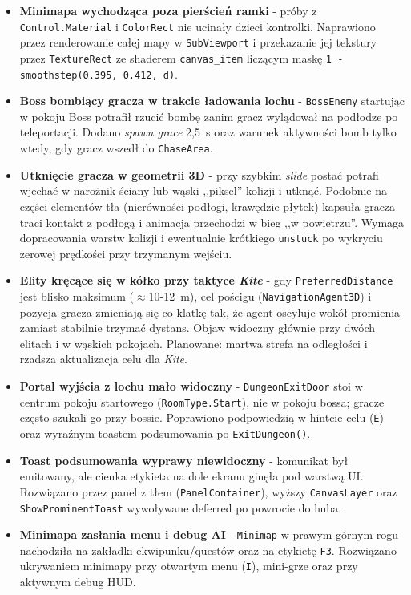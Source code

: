 \begin{itemize}
    \item \textbf{Minimapa wychodząca poza pierścień ramki} - próby z \texttt{Control.Material} i \texttt{ColorRect} nie ucinały dzieci kontrolki. Naprawiono przez renderowanie całej mapy w \texttt{SubViewport} i przekazanie jej tekstury przez \texttt{TextureRect} ze shaderem \texttt{canvas\_item} liczącym maskę \texttt{1 - smoothstep(0.395, 0.412, d)}.
    \item \textbf{Boss bombiący gracza w trakcie ładowania lochu} - \texttt{BossEnemy} startując w pokoju Boss potrafił rzucić bombę zanim gracz wylądował na podłodze po teleportacji. Dodano \emph{spawn grace} 2,5~s oraz warunek aktywności bomb tylko wtedy, gdy gracz wszedł do \texttt{ChaseArea}.
    \item \textbf{Utknięcie gracza w geometrii 3D} - przy szybkim \emph{slide} postać potrafi wjechać w narożnik ściany lub wąski ,,piksel'' kolizji i utknąć. Podobnie na części elementów tła (nierówności podłogi, krawędzie płytek) kapsuła gracza traci kontakt z podłogą i animacja przechodzi w bieg ,,w powietrzu''. Wymaga dopracowania warstw kolizji i ewentualnie krótkiego \texttt{unstuck} po wykryciu zerowej prędkości przy trzymanym wejściu.
    \item \textbf{Elity kręcące się w kółko przy taktyce \textit{Kite}} - gdy \texttt{PreferredDistance} jest blisko maksimum ($\approx 10$-12~m), cel pościgu (\texttt{NavigationAgent3D}) i pozycja gracza zmieniają się co klatkę tak, że agent oscyluje wokół promienia zamiast stabilnie trzymać dystans. Objaw widoczny głównie przy dwóch elitach i w wąskich pokojach. Planowane: martwa strefa na odległości i rzadsza aktualizacja celu dla \textit{Kite}.
    \item \textbf{Portal wyjścia z lochu mało widoczny} - \texttt{DungeonExitDoor} stoi w centrum pokoju startowego (\texttt{RoomType.Start}), nie w pokoju bossa; gracze często szukali go przy bossie. Poprawiono podpowiedzią w hintcie celu (\texttt{E}) oraz wyraźnym toastem podsumowania po \texttt{ExitDungeon()}.
    \item \textbf{Toast podsumowania wyprawy niewidoczny} - komunikat był emitowany, ale cienka etykieta na dole ekranu ginęła pod warstwą UI. Rozwiązano przez panel z tłem (\texttt{PanelContainer}), wyższy \texttt{CanvasLayer} oraz \texttt{ShowProminentToast} wywoływane deferred po powrocie do huba.
    \item \textbf{Minimapa zasłania menu i debug AI} - \texttt{Minimap} w prawym górnym rogu nachodziła na zakładki ekwipunku/questów oraz na etykietę \texttt{F3}. Rozwiązano ukrywaniem minimapy przy otwartym menu (\texttt{I}), mini-grze oraz przy aktywnym debug HUD.
\end{itemize}
